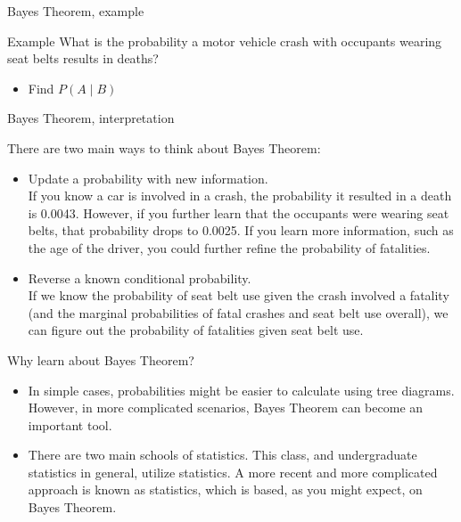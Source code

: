 \documentclass[xcolor=table, aspectratio=169, bigger]{beamer}
\begin{document}
\begin{frame}{Bayes Theorem, example}
\begin{exampleblock}{Example}
What is the probability a motor vehicle crash with occupants wearing seat belts results in deaths?\\ \smallskip
{} \smallskip

\begin{itemize}
\pause\item Find $P(A \mid B)$ \\ \smallskip
\pause{} \medskip
\pause{}
\end{itemize}

\end{exampleblock}
\end{frame}

\begin{frame}{Bayes Theorem, interpretation}
\begin{block}{}
There are two main ways to think about Bayes Theorem:

\begin{itemize}
\pause\item Update a probability with new information.\\ \smallskip
If you know a car is involved in a crash, the probability it resulted in a death is 0.0043. However, if you further learn that the occupants were wearing seat belts, that probability drops to 0.0025. If you learn more information, such as the age of the driver, you could further refine the probability of fatalities.

\pause\item Reverse a known conditional probability.\\ \smallskip
If we know the probability of seat belt use given the crash involved a fatality (and the marginal probabilities of fatal crashes and seat belt use overall), we can figure out the probability of fatalities given seat belt use.
\end{itemize}
\end{block}
\end{frame}

\begin{frame}{Why learn about Bayes Theorem?}
\begin{block}{}
\begin{itemize}
\item In simple cases, probabilities might be easier to calculate using tree diagrams. However, in more complicated scenarios, Bayes Theorem can become an important tool.

\pause\item There are two main schools of statistics. This class, and undergraduate statistics in general, utilize  statistics. A more recent and more complicated approach is known as  statistics, which is based, as you might expect, on Bayes Theorem. 
\end{itemize}
\end{block}
\end{frame}
\end{document}
